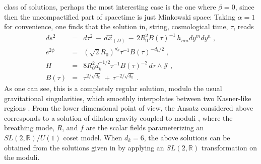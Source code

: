 \documentclass[a4paper,11pt]{article}
\begin{document}
class of solutions, perhaps the most interesting case is
the one where $\beta =0$, since then the uncompactified part of
spacetime is just Minkowski space:
Taking $\alpha =1$ for convenience, one finds that the solution 
in, string, cosmological time, $\tau$, reads 
\begin{eqnarray}
ds^{2} &=& d\tau^{2}\,-\, d\vec{x}_{(D)}
       \,-\, 2R^{2}_{0} B(\tau )^{-1} \,h_{mn}dy^{m}dy^{n} \; , \nonumber \\
e^{2\phi} &=& \left( \sqrt{2}R_{0} \right)^{d_{k}} \tau^{-1}B(\tau )^{-d_{k}/2}
       \; ,\nonumber \\
H &=& 8R_{0}^{2} d_{k}^{-1/2} \tau^{-1}B(\tau )^{-2}
      \, d\tau\wedge\mathcal{J}  \; , \\
B(\tau ) &=& \tau^{2/\sqrt{d_{k}}}\,+\, \tau^{-2/\sqrt{d_{k}}} \; .
\end{eqnarray}
As one can see, this is a completely regular solution,
modulo the usual gravitational 
singularities, which smoothly interpolates between two Kasner-like 
regions \cite{art:LOW}.
From the lower dimensional point of view, the Ansatz considered above
corresponds to a solution of dilaton-gravity coupled to
moduli \cite{art:witten}, where the breathing mode, $R$, and $f$ are
the scalar fields parameterizing an $SL(2,\mathbb{R})/U(1)$ coset model.
When $d_{k}=6$, the above solutions can be obtained from the solutions
given in \cite{art:CLW} by applying an $SL(2,\mathbb{R})$ transformation
on the moduli.
\end{document}
